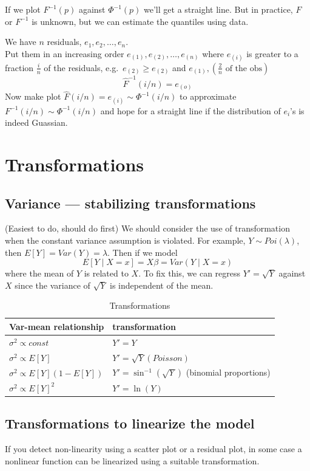 \documentclass[12 pt]{article}
\begin{document}
\begin{enumerate}
\begin{itemize}
If we plot $F^{-1}(p)$ against $\Phi^{-1}(p)$ we'll get a straight
line. But in practice, $F$ or $F^{-1}$ is unknown, but we can estimate
the quantiles using data.

We have $n$ residuals, $e_1, e_2, \ldots, e_n$.
\\ Put them in an increasing order $e_{(1)}, e_{(2)}, \ldots, e_{(n)}$
where $e_{(i)}$ is greater to a fraction $\frac{i}{n}$ of the
residuals, e.g.\ $e_{(2)} \geq e_{(2)}$ and $e_{(1)},
\left(\frac{2}{n} \text{ of the obs}\right)$
$$\hat{F}^{-1}(i/n) = e_{(o)}$$
Now make  plot $\hat{F}(i/n) = e_{(i)} \sim \Phi^{-1}(i/n)$ to
approximate $F^{-1}(i/n) \sim \Phi^{-1}(i/n)$ and hope for a straight
line if the distribution of $e_i$'s is indeed Guassian.
\end{itemize}
\end{enumerate}
\section{Transformations}
\subsection{Variance --- stabilizing transformations}
(Easiest to do, should do first) We should consider the use of transformation when the constant
variance assumption is violated. For example, $Y \sim Poi(\lambda)$,
then $E[Y] = Var(Y) = \lambda$. Then if we model
$$E[Y \mid X = x] = X \beta = Var(Y \mid X = x)$$ where the mean of
$Y$ is related to $X$. To fix this, we can regress $Y'=\sqrt{Y}$
against $X$ since the variance of $\sqrt{Y}$ is independent of the
mean.
\begin{table}[H]
  \centering
  \begin{tabular}{l l}
    Var-mean relationship & transformation
    \\ \hline$\sigma^2 \propto const$& $Y'=Y$
    \\ $\sigma^2 \propto E[Y]$ & $Y'=\sqrt{Y} (Poisson)$
    \\ $\sigma^2 \propto E[Y](1-E[Y])$ & $Y' = \sin^{-1}(\sqrt{Y})$ (binomial proportions)
    \\ $\sigma^2 \propto E[Y]^2$ & $Y'=\ln (Y)$
  \end{tabular}
  \caption{Transformations}
\end{table}
\subsection{Transformations to linearize the model}
If you detect non-linearity using a scatter plot or a residual plot,
in some case a nonlinear function can be linearized using a suitable
transformation.
\end{document}
